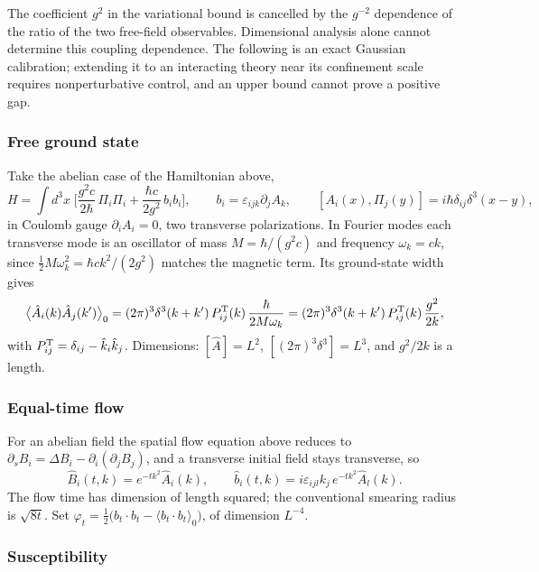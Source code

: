 \documentclass[11pt,a4paper]{article}
\begin{document}
The coefficient \(g^2\) in the variational bound is cancelled by the
\(g^{-2}\) dependence of the ratio of the two free-field observables.
Dimensional analysis alone cannot determine this coupling dependence.
The following is an exact Gaussian calibration; extending it to an
interacting theory near its confinement scale requires nonperturbative
control, and an upper bound cannot prove a positive gap.

\hypertarget{free-ground-state}{%
\subsubsection{Free ground state}\label{free-ground-state}}

Take the abelian case of the Hamiltonian above,
\[H=\int d^3x\;\Big[\frac{g^2c}{2\hbar}\,\Pi_i\Pi_i+\frac{\hbar c}{2g^2}\,b_ib_i\Big],
\qquad b_i=\varepsilon_{ijk}\partial_jA_k,
\qquad[A_i(x),\Pi_j(y)]=i\hbar\delta_{ij}\delta^3(x-y),\] in Coulomb
gauge \(\partial_iA_i=0\), two transverse polarizations. In Fourier
modes each transverse mode is an oscillator of mass \(M=\hbar/(g^2c)\)
and frequency \(\omega_k=ck\), since
\(\tfrac12M\omega_k^2=\hbar ck^2/(2g^2)\) matches the magnetic term. Its
ground-state width gives
\[\big\langle\hat A_i(k)\hat A_j(k')\big\rangle_0=(2\pi)^3\delta^3(k+k')\,P^{\rm T}_{ij}(k)\,\frac{\hbar}{2M\omega_k}
=(2\pi)^3\delta^3(k+k')\,P^{\rm T}_{ij}(k)\,\frac{g^2}{2k},\] with
\(P^{\rm T}_{ij}=\delta_{ij}-\hat k_i\hat k_j\). Dimensions:
\([\hat A]=L^2\), \([(2\pi)^3\delta^3]=L^3\), and \(g^2/2k\) is a
length.

\hypertarget{equal-time-flow}{%
\subsubsection{Equal-time flow}\label{equal-time-flow}}

For an abelian field the spatial flow equation above reduces to
\(\partial_sB_i=\Delta B_i-\partial_i(\partial_jB_j)\), and a transverse
initial field stays transverse, so
\[\hat B_i(t,k)=e^{-tk^2}\hat A_i(k),\qquad
\hat b_i(t,k)=i\varepsilon_{ijl}k_j\,e^{-tk^2}\hat A_l(k).\] The flow
time has dimension of length squared; the conventional smearing radius
is \(\sqrt{8t}\). Set
\(\varphi_t=\tfrac12\big(b_t\!\cdot\!b_t-\langle b_t\!\cdot\!b_t\rangle_0\big)\),
of dimension \(L^{-4}\).

\hypertarget{susceptibility}{%
\subsubsection{Susceptibility}\label{susceptibility}}
\end{document}
